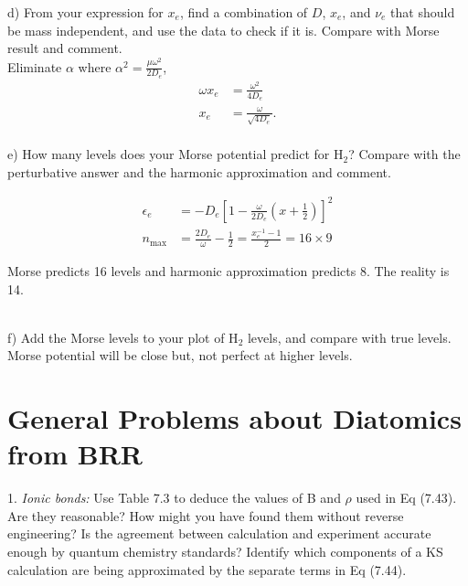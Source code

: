 \documentclass{article}
\begin{document}
\noindent d) From your expression for $x_e$, find a combination of $D$, $x_e$, and $\nu_e$
that should be mass independent, and use the data to check if it is.  Compare with
Morse result and comment.
\\

{\color{blue}
    Eliminate $\alpha$ where $\alpha^2 = \frac{\mu\omega^2}{2D_e}$,
  \begin{align*}
    \omega x_e & = \frac{\omega^2}{4D_e} \\
    x_e & = \frac{\omega}{\sqrt{4 D_e}}.
  \end{align*}
}
\\

\noindent e) How many levels does your Morse potential predict for H$_2$?  Compare with the
perturbative answer and the harmonic approximation and comment.

{\color{blue}
  \begin{align*}
    \epsilon_e & = -D_e[1-\frac{\omega}{2D_e}(x+\frac{1}{2})]^2 \\
    n_{\text{max}} & = \frac{2D_e}{\omega} - \frac{1}{2} = \frac{x_e^{-1}-1}{2} = 16\times9
  \end{align*}
  
  Morse predicts 16 levels and harmonic approximation predicts 8. The reality is 14.}
\\

\noindent f) Add the Morse levels to your plot of H$_2$ levels, and compare with true levels.
\\

{\color{blue} Morse potential will be close but, not perfect at higher levels.}

\pagebreak

\section*{General Problems about Diatomics from BRR}

  1. \textit{Ionic bonds:} Use Table 7.3 to deduce the values of B and $\rho$ used in
  Eq (7.43). Are they reasonable? How might you have found them without reverse engineering?
  Is the agreement between calculation and experiment accurate enough by quantum chemistry
  standards? Identify which components of a KS calculation are being approximated by the
  separate terms in Eq (7.44).
\end{document}
